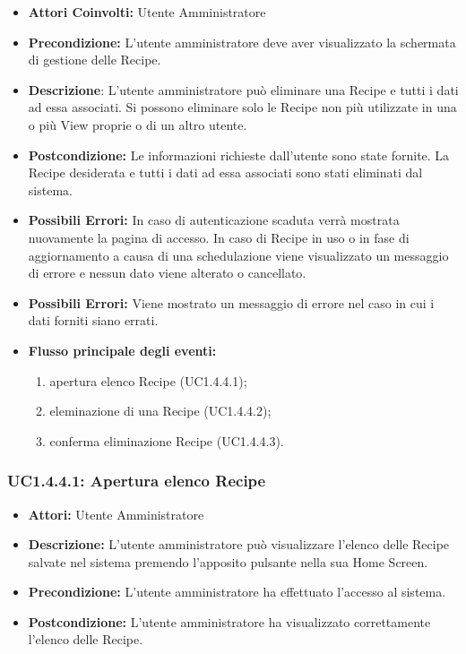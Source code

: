 \begin{itemize}
    \item \textbf{Attori Coinvolti:}
    Utente Amministratore

    \item \textbf{Precondizione:}
    L'utente amministratore deve aver visualizzato la schermata di gestione delle Recipe.

    \item \textbf{Descrizione}:
    L'utente amministratore può eliminare una Recipe e tutti i dati ad essa associati.
    Si possono eliminare solo le Recipe non più utilizzate in una o più View proprie o di un altro utente.

    \item \textbf{Postcondizione:}
    Le informazioni richieste dall'utente sono state fornite.
    La Recipe desiderata e tutti i dati ad essa associati sono stati eliminati dal sistema.

    \item \textbf{Possibili Errori:}
    In caso di autenticazione scaduta verrà mostrata nuovamente la pagina di accesso.
    In caso di Recipe in uso o in fase di aggiornamento a causa di una schedulazione viene visualizzato un messaggio di errore e nessun dato viene alterato o cancellato.
	\item \textbf{Possibili Errori:}
    Viene mostrato un messaggio di errore nel caso in cui i dati forniti siano errati.
    \item \textbf{Flusso principale degli eventi:}

    \begin{enumerate}
        \item apertura elenco Recipe (UC1.4.4.1);
        \item eleminazione di una Recipe (UC1.4.4.2);
        \item conferma eliminazione Recipe (UC1.4.4.3).
    \end{enumerate}

\end{itemize}

\subsubsection{UC1.4.4.1: Apertura elenco Recipe}

\begin{itemize}
    \item \textbf{Attori:} Utente Amministratore
    \item \textbf{Descrizione:} L'utente amministratore può visualizzare l'elenco delle Recipe salvate nel sistema premendo l'apposito pulsante nella sua Home Screen.
    \item \textbf{Precondizione:} L'utente amministratore ha effettuato l'accesso al sistema.
    \item \textbf{Postcondizione:} L'utente amministratore ha visualizzato correttamente l'elenco delle Recipe.
\end{itemize}

